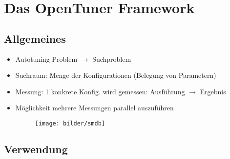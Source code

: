     
  
    
  \section{Das OpenTuner Framework}   
  \subsection{Allgemeines}
    
  \begin{frame}
  \textbf{}
    
  \begin{itemize}
    \item Autotuning-Problem $\rightarrow$ Suchproblem
    \item Suchraum: Menge der Konfigurationen (Belegung von Parametern)
    \item Messung: 1 konkrete Konfig. wird gemessen: Ausführung $\rightarrow$ Ergebnis
    \item Möglichkeit mehrere Messungen parallel auszuführen
    
    \begin{figure}[ht]
      \centering	      
      \texttt{[image: bilder/smdb]}
      \label{smdb}
    \end{figure}

  \end{itemize}
  \end{frame}
    
  \subsection{Verwendung}

